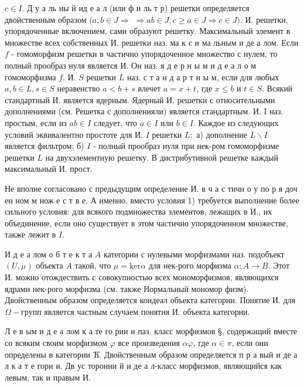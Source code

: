\documentclass[10pt]{article}
\begin{document}
$c \in I$. Д у а ль ны й ид е а л (или ф и ль т р) решетки определяется двойственным образом $(a, b \in J \Rightarrow$ $\Rightarrow a b \in J, c \geqslant a \in J \Rightarrow c \in J)$. И. решетки, упорядоченные включением, сами образуют решетку. Максимальный элемент в множестве всех собственных И. решетки наз. ма к с и ма льным и де а лом. Если $f$ - гомоморфизм решетки в частично упорядоченное множество с нулем, то полный прообраз нуля является И. Он наз. я д е р н ы м и д е а л о м гомоморфизма $f$. И. $S$ решетки $L$ наз. с т а н д а р т н ы м, если для любых $a, b \in L, s \in S$ неравенство $a<b+s$ влечет $a=x+t$, где $x \leqslant b$ и $t \in S$. Всякий стандартный И. является ядерным. Ядерный И. решетки с относительными дополнениями (см. Решетка с дополненияли) является стандартным. И. I наз. простым, если из $a b \in I$ следует, что $a \in I$ или $b \in I$. Каждое из следующих условий эквивалентно простоте для И. $I$ решетки $L:$ а) дополнение $L \backslash I$ является фильтром; б) $I$ - полный прообраз нуля при нек-ром гомоморфизме решетки $L$ на двухэлементную решетку. В дистрибутивной решетке каждый максимальный И. прост.



Не вполне согласовано с предыдущим определение И. в ч а с тичн о у по р я доч ен ном м нож е с т в е. А именно, вместо условия 1) требуется выполнение более сильного условия: для всякого подмножества элементов, лежащих в И., их объединение, если оно существует в этом частично упорядоченном множестве, также лежит в $I$.



И д е а лом о б т е к т а $A$ категории с нулевыми морфизмами наз. подобъект $(U, \mu)$ объекта $A$ такой, что $\mu=\mathrm{ker} \alpha$ для нек-рого морфизма $\alpha: A \rightarrow B$. Этот И. можно отождествить с совокупностью всех мономорфизмов, являющихся ядрами нек-рого морфизма (см. также Нормальный мономор физм). Двойственным образом определяется коидеал объекта категории. Понятие И. для $\Omega-г р у п п$ является частным случаем понятия И. объекта категории.



Л е в ым и д е а лом к а те го рии и паз. класс морфизмов §, содержащий вместе со всяким своим морфизмом $\varphi$ все произведения $\alpha \varphi$, где $\alpha \in \mathfrak{\pi}$, если они определены в категории Ћ̊. Двойственным образом определяется п р а вый и де а л к а т е гори и. Дв ус торонни й и де а л-класс морфизмов, являющийся как левым, так и правым И.
\end{document}
